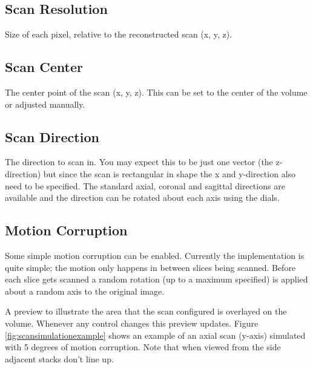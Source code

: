 \subsection*{Scan Resolution}
Size of each pixel, relative to the reconstructed scan (x, y, z).

\subsection*{Scan Center}
The center point of the scan (x, y, z). This can be set to the center of the volume or adjusted manually.

\subsection*{Scan Direction}
The direction to scan in. You may expect this to be just one vector (the z-direction) but since the scan is rectangular in shape the x and y-direction also need to be specified. The standard axial, coronal and sagittal directions are available and the direction can be rotated about each axis using the dials.

\subsection*{Motion Corruption}
Some simple motion corruption can be enabled. Currently the implementation is quite simple; the motion only happens in between slices being scanned. Before each slice gets scanned a random rotation (up to a maximum specified) is applied about a random axis to the original image.

A preview to illustrate the area that the scan configured is overlayed on the volume. Whenever any control changes this preview updates. Figure \ref{fig:scansimulationexample} shows an example of an axial scan (y-axis) simulated with 5 degrees of motion corruption. Note that when viewed from the side adjacent stacks don't line up.

